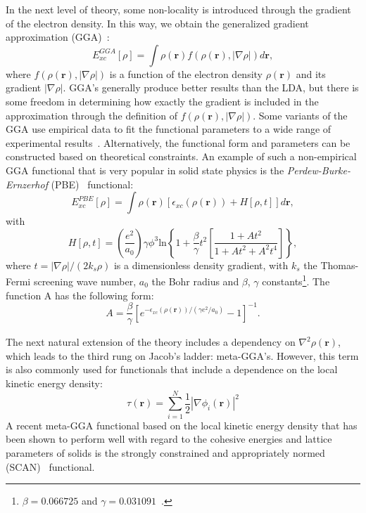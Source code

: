 \begin{refsection}
 \label{dft:sec-GGA}
In the next level of theory, some non-locality is introduced through the 
gradient of the electron density. In this way, we obtain the 
generalized gradient approximation (\gls{GGA})~\cite{Perdew1992}: 
\begin{equation} 
E_{xc}^{GGA}[\rho] = \int \rho(\mathbf{r}) f(\rho(\mathbf{r}),\left| \nabla 
\rho\right|)d\mathbf{r}, 
\end{equation} 
where $f(\rho(\mathbf{r}),\left| \nabla \rho\right|)$ is a function of the 
electron density $\rho(\mathbf{r})$ and its gradient $\left| \nabla 
\rho\right|$. \gls{GGA}'s generally produce better results than the \gls{LDA}, but 
there is some freedom in determining how exactly the gradient is included in 
the approximation through the definition of $f(\rho(\mathbf{r}),\left| \nabla 
\rho\right|)$. Some variants of the \gls{GGA} use empirical data to fit the 
functional parameters to a wide range of experimental results~\cite{Becke1988, Keal2004}. Alternatively, the functional form and parameters can be constructed based on theoretical constraints. An example of such a 
non-empirical \gls{GGA} functional that is very popular in solid state physics is the 
\textit{Perdew-Burke-Ernzerhof} (\gls{PBE})~\cite{Perdew1996} functional: 
\begin{equation} 
E_{xc}^{PBE}[\rho] = \int \rho(\mathbf{r}) \left[ 
\epsilon_{xc}(\rho(\mathbf{r})) + H[\rho,t] \right] d\mathbf{r}, 
\end{equation} 
with 
\begin{equation} 
H[\rho,t] = \left( \frac{e^2}{a_0} \right) \gamma \phi^3 \text{ln} \left\{ 1 + 
\frac{\beta}{\gamma} t^2 \left[ \frac{1 + A t^2}{1 + A t^2 + A^2 t^4} \right] 
\right\}, 
\end{equation} 
where $t = \left| \nabla \rho \right|/(2 k_s\rho)$ is a dimensionless density 
gradient, with $k_s$ the Thomas-Fermi screening wave number, $a_0$ the Bohr 
radius and $\beta$, $\gamma$ constants\footnote{$\beta = 0.066725$ and $\gamma 
= 0.031091$~\cite{Kohanoff2006}.}. The function A has the following form: 
\begin{equation} 
A = \frac{\beta}{\gamma} \left[ e^{-\epsilon_{xc}(\rho(\mathbf{r}))/(\gamma 
e^2 /a_0)} - 1 \right]^{-1}. 
\end{equation} 

 \label{dft:sec-metaGGA}
The next natural extension of the theory includes a dependency on $\nabla^2 
\rho(\mathbf{r})$, which leads to the third rung on Jacob's ladder: 
meta-GGA's. However, this term is also commonly used for functionals that 
include a dependence on the local kinetic energy density: 
\begin{equation} 
\tau (\mathbf{r}) = \sum_{i=1}^N \frac{1}{2} \left| \nabla \phi_i (\mathbf{r}) 
\right|^2 
\end{equation} 
A recent meta-GGA functional based on the local kinetic energy density that 
has been shown to perform well with regard to the cohesive energies and 
lattice parameters of solids is the strongly constrained and appropriately 
normed (\gls{SCAN})~\cite{Sun2015} functional. 
 

\end{refsection}
